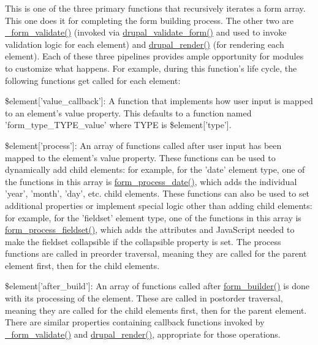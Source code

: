 This is one of the three primary functions that recursively iterates a form array. This one does it for completing the form building process. The other two are \hyperlink{group__form__api_ga464b4724506722d2a2d482df27736357}{\_\-form\_\-validate()} (invoked via \hyperlink{group__form__api_ga05a4aea7c6aa28db24a5f96da6948f34}{drupal\_\-validate\_\-form()} and used to invoke validation logic for each element) and \hyperlink{common_8inc_a05798b44e8d6c496d4bee5cc32fa7851}{drupal\_\-render()} (for rendering each element). Each of these three pipelines provides ample opportunity for modules to customize what happens. For example, during this function's life cycle, the following functions get called for each element:
\begin{DoxyItemize}
\item \$element\mbox{[}'value\_\-callback'\mbox{]}: A function that implements how user input is mapped to an element's value property. This defaults to a function named 'form\_\-type\_\-TYPE\_\-value' where TYPE is \$element\mbox{[}'type'\mbox{]}.
\item \$element\mbox{[}'process'\mbox{]}: An array of functions called after user input has been mapped to the element's value property. These functions can be used to dynamically add child elements: for example, for the 'date' element type, one of the functions in this array is \hyperlink{group__form__api_gabc6b74cff84954f970d4997390473160}{form\_\-process\_\-date()}, which adds the individual 'year', 'month', 'day', etc. child elements. These functions can also be used to set additional properties or implement special logic other than adding child elements: for example, for the 'fieldset' element type, one of the functions in this array is \hyperlink{group__form__api_gae2acfa7f531c487ac930d3a819ee63b5}{form\_\-process\_\-fieldset()}, which adds the attributes and JavaScript needed to make the fieldset collapsible if the collapsible property is set. The process functions are called in preorder traversal, meaning they are called for the parent element first, then for the child elements.
\item \$element\mbox{[}'after\_\-build'\mbox{]}: An array of functions called after \hyperlink{group__form__api_gae839323ba1c81ba86030b496fee24f7d}{form\_\-builder()} is done with its processing of the element. These are called in postorder traversal, meaning they are called for the child elements first, then for the parent element. There are similar properties containing callback functions invoked by \hyperlink{group__form__api_ga464b4724506722d2a2d482df27736357}{\_\-form\_\-validate()} and \hyperlink{common_8inc_a05798b44e8d6c496d4bee5cc32fa7851}{drupal\_\-render()}, appropriate for those operations.
\end{DoxyItemize}

